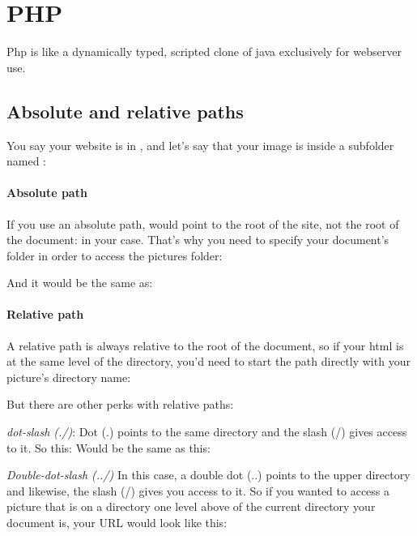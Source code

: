 \section{PHP}

Php is like a dynamically typed, scripted clone of java exclusively for webserver use. 


\subsection{Absolute and relative paths}

You say your website is in , and let's say that your image is inside a subfolder named :

\paragraph{Absolute path}

If you use an absolute path, \inlinecode{/} would point to the root of the site, not the root of the document:  in your case. That's why you need to specify your document's folder in order to access the pictures folder:

And it would be the same as: 

\paragraph{Relative path}

A relative path is always relative to the root of the document, so if your html is at the same level of the directory, you'd need to start the path directly with your picture's directory name: 

But there are other perks with relative paths:

\emph{dot-slash (./)}: Dot (.) points to the same directory and the slash (/) gives access to it.
So this: 
Would be the same as this: 

\emph{Double-dot-slash (../)} In this case, a double dot (..) points to the upper directory and likewise, the slash (/) gives you access to it. So if you wanted to access a picture that is on a directory one level above of the current directory your document is, your URL would look like this:  


